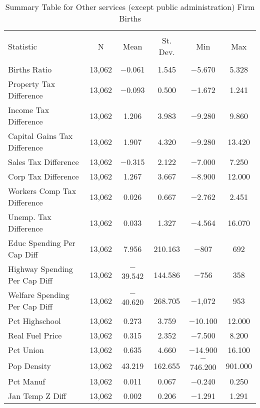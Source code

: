 
\begin{table}[!htbp] \centering 
  \caption{Summary Table for  Other services (except public administration) Firm Births} 
  \label{81summary} 
\begin{tabular}{@{\extracolsep{5pt}}lccccc} 
\\[-1.8ex]\hline 
\hline \\[-1.8ex] 
Statistic & \multicolumn{1}{c}{N} & \multicolumn{1}{c}{Mean} & \multicolumn{1}{c}{St. Dev.} & \multicolumn{1}{c}{Min} & \multicolumn{1}{c}{Max} \\ 
\hline \\[-1.8ex] 
Births Ratio & 13,062 & $-$0.061 & 1.545 & $-$5.670 & 5.328 \\ 
Property Tax Difference & 13,062 & $-$0.093 & 0.500 & $-$1.672 & 1.241 \\ 
Income Tax Difference & 13,062 & 1.206 & 3.983 & $-$9.280 & 9.860 \\ 
Capital Gains Tax Difference & 13,062 & 1.907 & 4.320 & $-$9.280 & 13.420 \\ 
Sales Tax Difference & 13,062 & $-$0.315 & 2.122 & $-$7.000 & 7.250 \\ 
Corp Tax Difference & 13,062 & 1.267 & 3.667 & $-$8.900 & 12.000 \\ 
Workers Comp Tax Difference & 13,062 & 0.026 & 0.667 & $-$2.762 & 2.451 \\ 
Unemp. Tax Difference & 13,062 & 0.033 & 1.327 & $-$4.564 & 16.070 \\ 
Educ Spending Per Cap Diff & 13,062 & 7.956 & 210.163 & $-$807 & 692 \\ 
Highway Spending Per Cap Diff & 13,062 & $-$39.542 & 144.586 & $-$756 & 358 \\ 
Welfare Spending Per Cap Diff & 13,062 & $-$40.620 & 268.705 & $-$1,072 & 953 \\ 
Pct Highschool & 13,062 & 0.273 & 3.759 & $-$10.100 & 12.000 \\ 
Real Fuel Price & 13,062 & 0.315 & 2.352 & $-$7.500 & 8.200 \\ 
Pct Union & 13,062 & 0.635 & 4.660 & $-$14.900 & 16.100 \\ 
Pop Density & 13,062 & 43.219 & 162.655 & $-$746.200 & 901.000 \\ 
Pct Manuf & 13,062 & 0.011 & 0.067 & $-$0.240 & 0.250 \\ 
Jan Temp Z Diff & 13,062 & 0.002 & 0.206 & $-$1.291 & 1.291 \\ 

\end{tabular}
\end{table}
